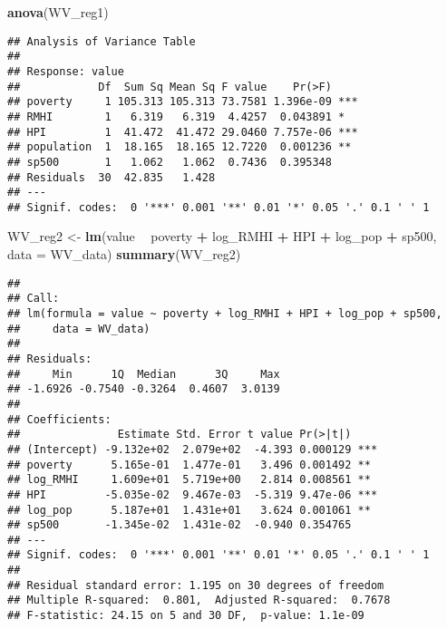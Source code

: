 \documentclass[
]{article}
\newenvironment{Shaded}{\begin{snugshade}}{\end{snugshade}}
\newcommand{\DataTypeTok}[1]{\textcolor[rgb]{0.13,0.29,0.53}{#1}}
\newcommand{\KeywordTok}[1]{\textcolor[rgb]{0.13,0.29,0.53}{\textbf{#1}}}
\newcommand{\NormalTok}[1]{#1}
\newcommand{\OperatorTok}[1]{\textcolor[rgb]{0.81,0.36,0.00}{\textbf{#1}}}
\newcommand{\StringTok}[1]{\textcolor[rgb]{0.31,0.60,0.02}{#1}}
\begin{document}
\begin{Shaded}
\begin{Highlighting}[]
\KeywordTok{anova}\NormalTok{(WV_reg1)}
\end{Highlighting}
\end{Shaded}

\begin{verbatim}
## Analysis of Variance Table
## 
## Response: value
##            Df  Sum Sq Mean Sq F value    Pr(>F)    
## poverty     1 105.313 105.313 73.7581 1.396e-09 ***
## RMHI        1   6.319   6.319  4.4257  0.043891 *  
## HPI         1  41.472  41.472 29.0460 7.757e-06 ***
## population  1  18.165  18.165 12.7220  0.001236 ** 
## sp500       1   1.062   1.062  0.7436  0.395348    
## Residuals  30  42.835   1.428                      
## ---
## Signif. codes:  0 '***' 0.001 '**' 0.01 '*' 0.05 '.' 0.1 ' ' 1
\end{verbatim}

\begin{Shaded}
\begin{Highlighting}[]
\NormalTok{WV_reg2 <-}\StringTok{ }\KeywordTok{lm}\NormalTok{(value }\OperatorTok{~}\StringTok{ }\NormalTok{poverty }\OperatorTok{+}\StringTok{ }\NormalTok{log_RMHI }\OperatorTok{+}\StringTok{ }\NormalTok{HPI }\OperatorTok{+}\StringTok{ }\NormalTok{log_pop }\OperatorTok{+}\StringTok{ }\NormalTok{sp500, }\DataTypeTok{data =}\NormalTok{ WV_data)}
\KeywordTok{summary}\NormalTok{(WV_reg2)}
\end{Highlighting}
\end{Shaded}

\begin{verbatim}
## 
## Call:
## lm(formula = value ~ poverty + log_RMHI + HPI + log_pop + sp500, 
##     data = WV_data)
## 
## Residuals:
##     Min      1Q  Median      3Q     Max 
## -1.6926 -0.7540 -0.3264  0.4607  3.0139 
## 
## Coefficients:
##               Estimate Std. Error t value Pr(>|t|)    
## (Intercept) -9.132e+02  2.079e+02  -4.393 0.000129 ***
## poverty      5.165e-01  1.477e-01   3.496 0.001492 ** 
## log_RMHI     1.609e+01  5.719e+00   2.814 0.008561 ** 
## HPI         -5.035e-02  9.467e-03  -5.319 9.47e-06 ***
## log_pop      5.187e+01  1.431e+01   3.624 0.001061 ** 
## sp500       -1.345e-02  1.431e-02  -0.940 0.354765    
## ---
## Signif. codes:  0 '***' 0.001 '**' 0.01 '*' 0.05 '.' 0.1 ' ' 1
## 
## Residual standard error: 1.195 on 30 degrees of freedom
## Multiple R-squared:  0.801,  Adjusted R-squared:  0.7678 
## F-statistic: 24.15 on 5 and 30 DF,  p-value: 1.1e-09
\end{verbatim}
\end{document}
